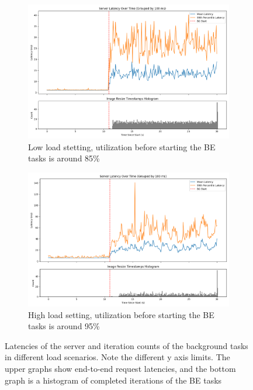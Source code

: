 \begin{figure}[t]
    \centering
    \begin{subfigure}{\columnwidth}
        \includegraphics[width=\columnwidth]{graphs/srv-bg-unedited-low.png}
        \caption{Low load stetting, utilization before starting the BE tasks is
        around 85\%}\label{fig:srv-bg-unedited-low}
        \vspace{12pt}
    \end{subfigure}
    \hspace{\fill}
    \begin{subfigure}{\columnwidth}
        \includegraphics[width=\columnwidth]{graphs/srv-bg-unedited-high.png}
        \caption{High load setting, utilization before starting the BE tasks is
        around 95\%}\label{fig:srv-bg-unedited-high}
    \end{subfigure}
    \vspace{4pt}
    \caption{Latencies of the server and iteration counts of the background
    tasks in different load scenarios. Note the different y axis limits. The
    upper graphs show end-to-end request latencies, and the bottom graph is a
    histogram of completed iterations of the BE tasks}\label{fig:srv-bg-unedited}
\end{figure}


